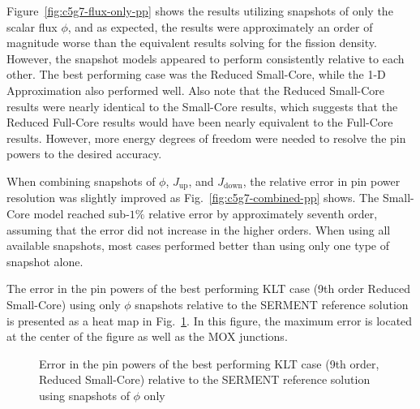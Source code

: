\documentclass[5p,times,twocolumn,10pt]{elsarticle}
\newcommand{\FIG}[1]{Fig.~\ref{#1}}               %
\newcommand{\FIGURE}[1]{Figure~\ref{#1}}
\begin{document}
\FIGURE{fig:c5g7-flux-only-pp} shows the results utilizing snapshots of only the 
scalar flux $\phi$, and as expected, the results were approximately an order of 
magnitude worse than the equivalent results solving for the fission density.  
However, the snapshot models appeared to perform consistently relative to 
each other.  The best performing case was the Reduced Small-Core, while the 1-D 
Approximation also performed well.  Also note that the Reduced Small-Core 
results were nearly identical to the Small-Core results, which suggests that the 
Reduced Full-Core results would have been nearly equivalent to the Full-Core results.  
However, more energy degrees of freedom were needed to resolve the pin powers to 
the desired accuracy.

When combining snapshots of $\phi$, $J_{\text{up}}$, and $J_{\text{down}}$, the relative 
error in pin power resolution was slightly improved as \FIG{fig:c5g7-combined-pp} shows.  The 
Small-Core model reached sub-$1\%$ relative 
error by approximately seventh order, assuming that the error did not increase 
in the higher orders.  When using all available snapshots, most 
cases performed better than using only one type of snapshot alone.

The error in the pin powers of the best performing KLT case (9th order 
Reduced Small-Core) using only $\phi$ snapshots relative to the SERMENT 
reference solution is presented as a heat map in \FIG{fig:serklt}.  In this 
figure, the maximum error is located at the center of the figure as well as the MOX junctions.

\begin{figure}[htb]
\caption{Error in the pin powers of the best performing KLT case (9th 
order, Reduced Small-Core) relative to the SERMENT 
reference solution using snapshots of $\phi$ only}
\label{fig:serklt}
\end{figure}
\end{document}
